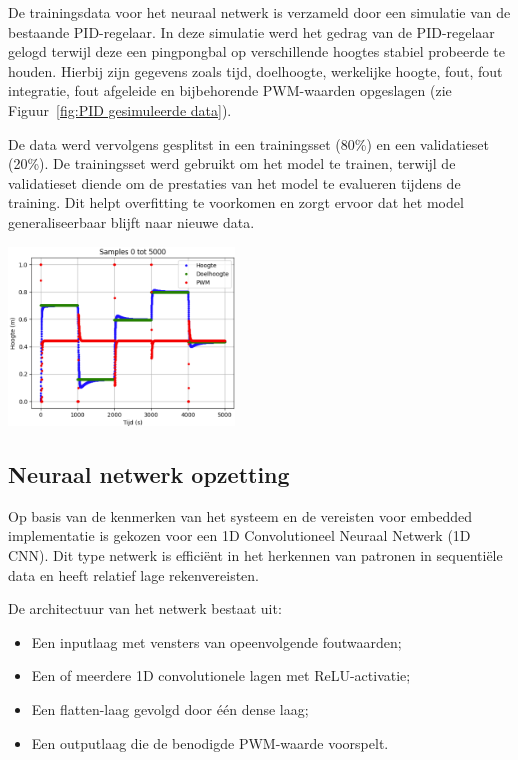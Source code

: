 De trainingsdata voor het neuraal netwerk is verzameld door een simulatie van de bestaande PID-regelaar. In deze simulatie werd het gedrag van de PID-regelaar gelogd terwijl deze een pingpongbal op verschillende hoogtes stabiel probeerde te houden. Hierbij zijn gegevens zoals tijd, doelhoogte, werkelijke hoogte, fout, fout integratie, fout afgeleide en bijbehorende PWM-waarden opgeslagen (zie Figuur~\ref{fig:PID gesimuleerde data}).

De data werd vervolgens gesplitst in een trainingsset (80\%) en een validatieset (20\%). De trainingsset werd gebruikt om het model te trainen, terwijl de validatieset diende om de prestaties van het model te evalueren tijdens de training. Dit helpt overfitting te voorkomen en zorgt ervoor dat het model generaliseerbaar blijft naar nieuwe data.

\begin{center}
\centering
\includegraphics[width=0.45\textwidth]{./afbeeldingen/data.png}
\label{fig:PID gesimuleerde data}
\end{center}

\subsection{Neuraal netwerk opzetting}

Op basis van de kenmerken van het systeem en de vereisten voor embedded implementatie is gekozen voor een 1D Convolutioneel Neuraal Netwerk (1D CNN). Dit type netwerk is efficiënt in het herkennen van patronen in sequentiële data en heeft relatief lage rekenvereisten.

De architectuur van het netwerk bestaat uit:
\begin{itemize}
    \item Een inputlaag met vensters van opeenvolgende foutwaarden;
    \item Een of meerdere 1D convolutionele lagen met ReLU-activatie;
    \item Een flatten-laag gevolgd door één dense laag;
    \item Een outputlaag die de benodigde PWM-waarde voorspelt.
\end{itemize}


